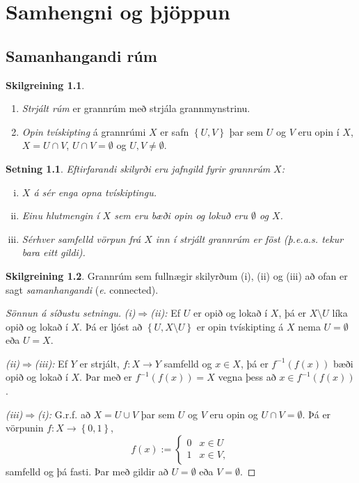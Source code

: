 \documentclass[a4paper,icelandic]{book}
\theoremstyle{definition}
\newtheorem{skilgr}{Skilgreining}[section]
\theoremstyle{plain}
\newtheorem{setn}{Setning}[section]
\theoremstyle{remark}
\begin{document}
\chapter{Samhengni og þjöppun}

\section{Samanhangandi rúm}
\begin{skilgr}
  \begin{enumerate}[(1)]
    \item \emph{Strjált rúm} er grannrúm með strjála
      grannmynstrinu.
    \item \emph{Opin tvískipting} á grannrúmi $X$ er
      safn $\left\{ U,V \right\}$ þar sem $U$ og $V$ eru opin í $X$, 
      $X = U\cap V$, $U\cap V= \emptyset$ og $U,V\neq \emptyset$.
  \end{enumerate}
\end{skilgr}
\begin{setn}
  Eftirfarandi skilyrði eru jafngild fyrir grannrúm $X$:
  \begin{enumerate}[(i)]
    \item $X$ á sér enga opna tvískiptingu.
    \item Einu hlutmengin í $X$ sem eru bæði opin og lokuð eru $\emptyset$ og
      $X$.
    \item Sérhver samfelld vörpun frá $X$ inn í strjált grannrúm er föst
      (þ.e.a.s. tekur bara eitt gildi). 
  \end{enumerate}
\end{setn}
\begin{skilgr}
  Grannrúm sem fullnægir skilyrðum (i), (ii) og (iii) að ofan er sagt
  \emph{samanhangandi} (\emph{e}. connected).
\end{skilgr}
\begin{proof}
  [Sönnun á síðustu setningu]
  \emph{(i)$\Rightarrow$(ii):} Ef $U$ er opið og lokað í $X$, þá er $X\setminus
  U$ líka opið og lokað í $X$. Þá er ljóst að $\left\{ U,X\setminus U \right\}$
  er opin tvískipting á $X$ nema $U=\emptyset$ eða $U=X$.

  \emph{(ii)$\Rightarrow$(iii):} Ef $Y$ er strjált, $f:X\to Y$ samfelld og
  $x\in X$, þá er $f^{-1}(f(x))$ bæði opið og lokað í $X$. Þar með er
  $f^{-1}(f(x))=X$ vegna þess að $x\in f^{-1}(f(x))$.

  \emph{(iii)$\Rightarrow$(i):} G.r.f. að $X=U\cup V$ þar sem $U$ og $V$ eru
  opin og $U\cap V=\emptyset$. Þá er vörpunin $f:X\to \left\{ 0,1 \right\}$, \[
  f(x) := 
  \begin{cases}
    0 & x\in U\\
    1 & x\in V,
  \end{cases}
  \]
  samfelld og þá fasti. Þar með gildir að $U = \emptyset$ eða $V = \emptyset$.
\end{proof}
\end{document}
